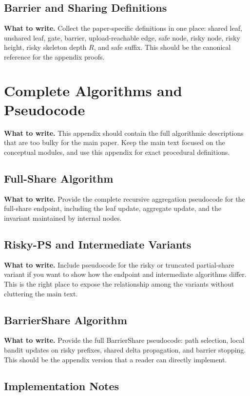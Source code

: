 \documentclass{article}
\newcommand{\towrite}[1]{\noindent\textbf{What to write.} #1}
\begin{document}
\subsection{Barrier and Sharing Definitions}

\towrite{Collect the paper-specific definitions in one place: shared leaf, unshared leaf, gate, barrier, upload-reachable edge, safe node, risky node, risky height, risky skeleton depth $R$, and safe suffix. This should be the canonical reference for the appendix proofs.}

\section{Complete Algorithms and Pseudocode}

\towrite{This appendix should contain the full algorithmic descriptions that are too bulky for the main paper. Keep the main text focused on the conceptual modules, and use this appendix for exact procedural definitions.}

\subsection{Full-Share Algorithm}

\towrite{Provide the complete recursive aggregation pseudocode for the full-share endpoint, including the leaf update, aggregate update, and the invariant maintained by internal nodes.}

\subsection{Risky-PS and Intermediate Variants}

\towrite{Include pseudocode for the risky or truncated partial-share variant if you want to show how the endpoint and intermediate algorithms differ. This is the right place to expose the relationship among the variants without cluttering the main text.}

\subsection{BarrierShare Algorithm}

\towrite{Provide the full BarrierShare pseudocode: path selection, local bandit updates on risky prefixes, shared delta propagation, and barrier stopping. This should be the appendix version that a reader can directly implement.}

\subsection{Implementation Notes}
\end{document}
